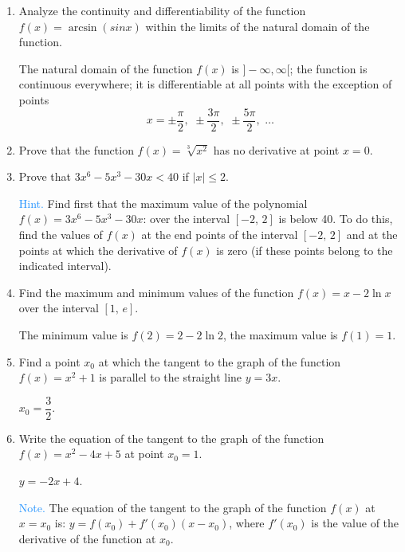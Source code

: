 \begin{enumerate}[label=\textcolor{IndianRed}{Problem \arabic*},leftmargin=2cm]
\item Analyze the continuity and differentiability of the function $f (x) = \arcsin (sin x)$ within the limits of the natural domain of the function. 

\Answer The natural domain of the function $f (x)$ is $]-\infty, \infty[$; the function is continuous everywhere; it is differentiable at all points with the exception of points
\begin{equation*}%
x = \pm \dfrac{\pi}{2}, \,\, \pm \dfrac{3 \pi}{2}, \,\, \pm \dfrac{5 \pi}{2}, \,\, \ldots
\end{equation*}

\item Prove that the function $f (x) = \sqrt[3]{x^{2}}$ has no derivative at point $x = 0$.

\item Prove that $3x^{6} -	5x^{3} - 30x < 40$ if $|x| \leqslant 2$. 

\textcolor{DodgerBlue}{Hint.} Find first that the maximum value of the polynomial $f (x) = 3x^{6} -	5x^{3} - 30x$: over the interval $[-2, \, 2]$ is below 40. To do this, find the values of $f (x)$ at the end points of the interval $[-2, \, 2]$ and at the points at which the derivative of $f (x)$ is zero (if these points belong to the indicated interval).

\item Find the maximum and minimum values of the function $f(x) = x- 2 \ln x$ over the interval $[1, \, e]$. 

\Answer The minimum value is $f(2)= 2- 2 \ln 2$, the maximum value is $f (1) = 1$.

\item Find a point $x_{0}$ at which the tangent to the graph of the function $f (x) = x^{2} + 1$ is parallel to the straight line $y= 3x$.

\Answer $x_{0} = \dfrac{3}{2}$.

\item Write the equation of the tangent to the graph of the function $f (x) = x^{2} - 4x +5$ at point $x_{0} = 1$.

 \Answer $y =- 2x + 4$.

\textcolor{DodgerBlue}{Note.} The equation of the tangent to the graph of the function $f(x)$ at $x=x_{0}$ is: $y= f(x_{0}) + f'(x_{0}) (x- x_{0})$, where $f' (x_{0})$ is the value of the derivative of the function at $ x_{0}$.


\end{enumerate}
